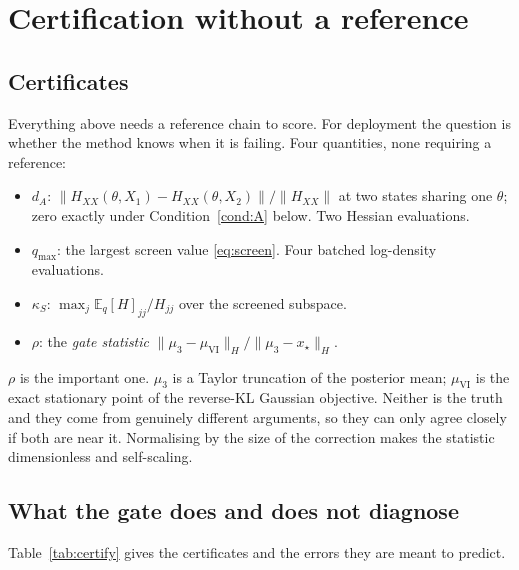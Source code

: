 \documentclass[11pt]{article}
\newcommand{\E}{\mathbb{E}}
\newcommand{\xmap}{x_{\star}}
\theoremstyle{plain}
\theoremstyle{definition}
\theoremstyle{remark}
\begin{document}
\section{Certification without a reference}
\label{sec:certify}

\subsection{Certificates}

Everything above needs a reference chain to score. For deployment the question is whether the
method knows when it is failing. Four quantities, none requiring a reference:

\begin{itemize}[leftmargin=1.5em,itemsep=1pt]
\item $d_A$: $\|H_{XX}(\theta,X_1)-H_{XX}(\theta,X_2)\|/\|H_{XX}\|$ at two states sharing one
$\theta$; zero exactly under Condition~\ref{cond:A} below. Two Hessian evaluations.
\item $q_{\max}$: the largest screen value \eqref{eq:screen}. Four batched log-density evaluations.
\item $\kappa_S$: $\max_j \E_q[H]_{jj}/H_{jj}$ over the screened subspace.
\item $\rho$: the \emph{gate statistic} $\|\mu_3-\mu_{\text{VI}}\|_H/\|\mu_3-\xmap\|_H$.
\end{itemize}

$\rho$ is the important one. $\mu_3$ is a Taylor truncation of the posterior mean;
$\mu_{\text{VI}}$ is the exact stationary point of the reverse-KL Gaussian objective. Neither is the
truth and they come from genuinely different arguments, so they can only agree closely if both are
near it. Normalising by the size of the correction makes the statistic dimensionless and
self-scaling.

\subsection{What the gate does and does not diagnose}

Table~\ref{tab:certify} gives the certificates and the errors they are meant to predict.
\end{document}
